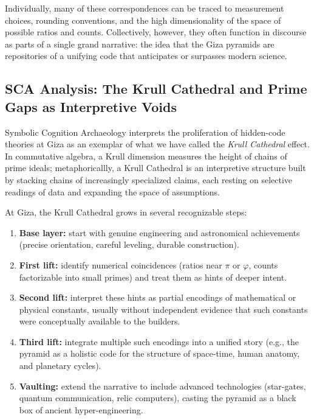 \documentclass[12]{amsart}
\theoremstyle{plain}
\begin{document}
Individually, many of these correspondences can be traced to measurement choices, rounding conventions, and the high dimensionality of the space of possible ratios and counts. Collectively, however, they often function in discourse as parts of a single grand narrative: the idea that the Giza pyramids are repositories of a unifying code that anticipates or surpasses modern science.

\subsection{SCA Analysis: The Krull Cathedral and Prime Gaps as Interpretive Voids}

Symbolic Cognition Archaeology interprets the proliferation of hidden-code theories at Giza as an exemplar of what we have called the \emph{Krull Cathedral} effect. In commutative algebra, a Krull dimension measures the height of chains of prime ideals; metaphoricallly, a Krull Cathedral is an interpretive structure built by stacking chains of increasingly specialized claims, each resting on selective readings of data and expanding the space of assumptions.

At Giza, the Krull Cathedral grows in several recognizable steps:

\begin{enumerate}
  \item \textbf{Base layer:} start with genuine engineering and astronomical achievements (precise orientation, careful leveling, durable construction).
  \item \textbf{First lift:} identify numerical coincidences (ratios near $\pi$ or $\varphi$, counts factorizable into small primes) and treat them as hints of deeper intent.
  \item \textbf{Second lift:} interpret these hints as partial encodings of mathematical or physical constants, usually without independent evidence that such constants were conceptually available to the builders.
  \item \textbf{Third lift:} integrate multiple such encodings into a unified story (e.g., the pyramid as a holistic code for the structure of space-time, human anatomy, and planetary cycles).
  \item \textbf{Vaulting:} extend the narrative to include advanced technologies (star-gates, quantum communication, relic computers), casting the pyramid as a black box of ancient hyper-engineering.
\end{enumerate}
\end{document}
